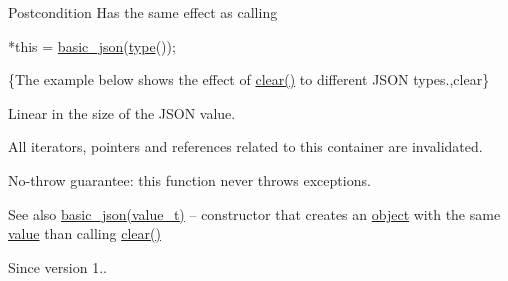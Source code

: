 \begin{DoxyPostcond}{Postcondition}
Has the same effect as calling 
\begin{DoxyCode}
*\textcolor{keyword}{this} = \mbox{\hyperlink{classnlohmann_1_1basic__json_aed115142bd0c6c66c864700e0467df55}{basic\_json}}(\mbox{\hyperlink{classnlohmann_1_1basic__json_a2b2d781d7f2a4ee41bc0016e931cadf7}{type}}());
\end{DoxyCode}

\end{DoxyPostcond}
\{The example below shows the effect of {\ttfamily \mbox{\hyperlink{classnlohmann_1_1basic__json_abfeba47810ca72f2176419942c4e1952}{clear()}}} to different J\+S\+ON types.,clear\}

Linear in the size of the J\+S\+ON value.

All iterators, pointers and references related to this container are invalidated.

No-\/throw guarantee\+: this function never throws exceptions.

\begin{DoxySeeAlso}{See also}
\mbox{\hyperlink{classnlohmann_1_1basic__json_aed115142bd0c6c66c864700e0467df55}{basic\+\_\+json(value\+\_\+t)}} -- constructor that creates an \mbox{\hyperlink{classnlohmann_1_1basic__json_aa13f7c0615867542ce80337cbcf13ada}{object}} with the same \mbox{\hyperlink{classnlohmann_1_1basic__json_adcf8ca5079f5db993820bf50036bf45d}{value}} than calling {\ttfamily \mbox{\hyperlink{classnlohmann_1_1basic__json_abfeba47810ca72f2176419942c4e1952}{clear()}}}
\end{DoxySeeAlso}
\begin{DoxySince}{Since}
version 1.. 
\end{DoxySince}
\mbox{\label{classnlohmann_1_1basic__json_a5261eba9637f59d17d6cab5f14ce5747}} 
